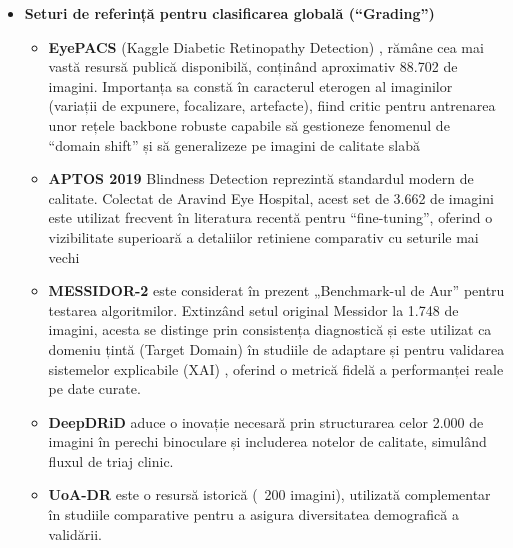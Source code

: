 \documentclass[12pt, a4paper, twoside, romanian]{teza-upb}
\begin{document}
\begin{itemize}
  \item \textbf{Seturi de referință pentru clasificarea globală (“Grading”)}
  
      \begin{itemize}
          \item \textbf{EyePACS} (Kaggle Diabetic Retinopathy Detection) \cite{3_gulshan2016development}, \cite{9_chetoui2020explainable} rămâne cea mai 
                vastă resursă publică disponibilă, conținând aproximativ 88.702 de imagini. Importanța sa constă în caracterul eterogen al
                imaginilor (variații de expunere, focalizare, artefacte), fiind critic pentru antrenarea unor
                rețele backbone robuste capabile să gestioneze fenomenul de “domain shift” \cite{8_zhang2022multi} și să generalizeze pe
                imagini de calitate slabă

          \item \textbf{APTOS 2019} Blindness Detection \cite{9_chetoui2020explainable} reprezintă standardul modern de calitate. Colectat de Aravind Eye
                Hospital, acest set de 3.662 de imagini este utilizat frecvent în literatura recentă pentru “fine-tuning”,
                oferind o vizibilitate superioară a detaliilor retiniene comparativ cu seturile mai vechi

          \item \textbf{MESSIDOR-2} \cite{9_chetoui2020explainable} este considerat în prezent „Benchmark-ul de Aur” pentru testarea algoritmilor.
                Extinzând setul original Messidor la 1.748 de imagini, acesta se distinge prin consistența diagnostică și
                este utilizat ca domeniu țintă (Target Domain) în studiile de adaptare \cite{8_zhang2022multi} și pentru validarea sistemelor
                explicabile (XAI) \cite{9_chetoui2020explainable}, oferind o metrică fidelă a performanței reale pe date curate.

          \item \textbf{DeepDRiD} \cite{14_liu2022deepdrid} aduce o inovație necesară prin structurarea
                celor 2.000 de imagini în perechi binoculare și includerea notelor de calitate, simulând fluxul de triaj
                clinic.

          \item \textbf{UoA-DR} \cite{9_chetoui2020explainable} este o resursă istorică (~200 imagini), utilizată
                complementar în studiile comparative pentru a asigura diversitatea demografică a validării.
      \end{itemize}


\end{itemize}
\end{document}
